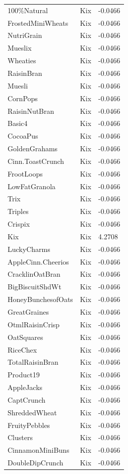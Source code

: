 \begin{table}[!htbp]
\begin{tabular}{lll}
100\%Natural & Kix & -0.0466
\\
FrostedMiniWheats & Kix & -0.0466
\\
NutriGrain & Kix & -0.0466
\\
Mueslix & Kix & -0.0466
\\
Wheaties & Kix & -0.0466
\\
RaisinBran & Kix & -0.0466
\\
Muesli & Kix & -0.0466
\\
CornPops & Kix & -0.0466
\\
RaisinNutBran & Kix & -0.0466
\\
Basic4 & Kix & -0.0466
\\
CocoaPus & Kix & -0.0466
\\
GoldenGrahams & Kix & -0.0466
\\
Cinn.ToastCrunch & Kix & -0.0466
\\
FrootLoops & Kix & -0.0466
\\
LowFatGranola & Kix & -0.0466
\\
Trix & Kix & -0.0466
\\
Triples & Kix & -0.0466
\\
Crispix & Kix & -0.0466
\\
Kix & Kix & 4.2708
\\
LuckyCharms & Kix & -0.0466
\\
AppleCinn.Cheerios & Kix & -0.0466
\\
CracklinOatBran & Kix & -0.0466
\\
BigBiscuitShdWt & Kix & -0.0466
\\
HoneyBunchesofOats & Kix & -0.0466
\\
GreatGraines & Kix & -0.0466
\\
OtmlRaisinCrisp & Kix & -0.0466
\\
OatSquares & Kix & -0.0466
\\
RiceChex & Kix & -0.0466
\\
TotalRaisinBran & Kix & -0.0466
\\
Product19 & Kix & -0.0466
\\
AppleJacks & Kix & -0.0466
\\
CaptCrunch & Kix & -0.0466
\\
ShreddedWheat & Kix & -0.0466
\\
FruityPebbles & Kix & -0.0466
\\
Clusters & Kix & -0.0466
\\
CinnamonMiniBuns & Kix & -0.0466
\\
DoubleDipCrunch & Kix & -0.0466
\\

\end{tabular}
\end{table}
